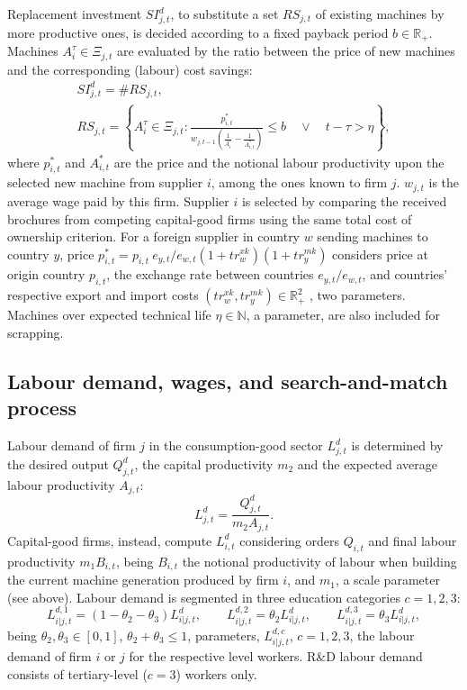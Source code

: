 \documentclass[a4paper,11pt]{article}
\begin{document}
\begin{appendices}
Replacement investment ${SI}^d_{j,t}$, to substitute a set $RS_{j,t}$ of existing machines by more productive ones, is decided according to a fixed payback period $b \in \mathbb{R}_+$. Machines $A_i^\tau \in \Xi_{j,t}$ are evaluated by the ratio between the price of new machines and the corresponding (labour) cost savings:
\begin{equation}
	\begin{gathered}
		SI^d_{j,t} = \# RS_{j,t},\\
		RS_{j,t} = \left\{ A_i^\tau \in \Xi_{j,t}: \frac{ p^*_{i,t} }{ w_{j,t-1} \left( \frac{ 1 }{ A_i^\tau } - \frac{ 1 }{ A^*_{i,t} } \right) } \leq b \quad \lor \quad t - \tau > \eta \right\},
	\end{gathered}
	\label{scrap}
\end{equation}
where $p^*_{i,t}$ and $A^*_{i,t}$ are the price and the notional labour productivity upon the selected new machine from supplier $i$, among the ones known to firm $j$. $w_{j,t}$ is the average wage paid by this firm. Supplier $i$ is selected by comparing the received brochures from competing capital-good firms using the same total cost of ownership criterion. For a foreign supplier in country $w$ sending machines to country $y$, price $p^*_{i,t} = p_{i,t} ~ e_{y,t}/e_{w,t} \left( 1 + {tr}_w^{xk} \right) \left( 1 + {tr}_y^{mk} \right)$ considers price at origin country $p_{i,t}$, the exchange rate between countries $e_{y,t}/e_{w,t}$, and countries' respective export and import costs $({tr}_w^{xk}, {tr}_y^{mk}) \in \mathbb{R}_+^2$ , two parameters. Machines over expected technical life $\eta \in \mathbb{N}$, a parameter, are also included for scrapping.


\subsection*{Labour demand, wages, and search-and-match process}

Labour demand of firm $j$ in the consumption-good sector $L_{j,t}^d$ is determined by the desired output $Q^d_{j,t}$, the capital productivity $m_2$ and the expected average labour productivity $A_{j,t}$:
\begin{equation}
	L_{j,t}^d = \frac{ Q^d_{j,t} }{ m_2 A_{j,t} }.
\end{equation}
Capital-good firms, instead, compute $L_{i,t}^d$ considering orders $Q_{i,t}$ and final labour productivity $m_1 B_{i,t}$, being $B_{i,t}$ the notional productivity of labour when building the current machine generation produced by firm $i$, and $m_1$, a scale parameter (see above). Labour demand is segmented in three education categories $c = 1, 2, 3$:
\begin{equation}
	L_{i|j,t}^{d,1} = \left( 1 - \theta_2 - \theta_3 \right) L_{i|j,t}^d, \qquad L_{i|j,t}^{d,2} = \theta_2 L_{i|j,t}^d, \qquad L_{i|j,t}^{d,3} = \theta_3 L_{i|j,t}^d,
\end{equation}
being $\theta_2, \theta_3 \in [0, 1]$, $\theta_2 + \theta_3 \le 1$, parameters, $L_{i|j,t}^{d,c}$, $c = 1, 2, 3$, the labour demand of firm $i$ or $j$ for the respective level workers. R\&D labour demand consists of tertiary-level ($c=3$) workers only.


\end{appendices}
\end{document}
